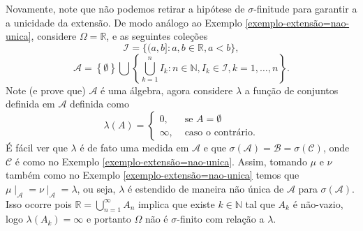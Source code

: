 \begin{exemplo}
    Novamente, note que não podemos retirar a hipótese de $\sigma$-finitude
    para garantir a a unicidade da extensão. De modo análogo ao Exemplo 
    \ref{exemplo-extensão=nao-unica}, considere $\Omega = \mathbb{R}$, e as seguintes
    coleções
    \[
	    \mathcal{I} =\{(a,b] : a,b \in \mathbb{R}, a<b\},
	\]
	\[
	    \mathcal{A} =\left\{\emptyset\right\} \bigcup
	    \left\{\bigcup_{k=1}^n I_k : n \in \mathbb{N}, 
	    I_k \in \mathcal{I}, k = 1, \dots, n\right\}.
	\]
    Note (e prove que) $\mathcal{A}$ é uma álgebra, agora considere $\lambda$ a 
    função de conjuntos definida em $\mathcal{A}$ definida como 
    \[
        \lambda(A)= \begin{cases}
                        0, & \text{ se } A = \emptyset \\
                        \infty, & \text { caso o contrário.}    
                    \end{cases}
    \]
    É fácil ver que $\lambda$ é de fato uma medida em $\mathcal{A}$ e que
    $\sigma(\mathcal{A}) = \mathcal{B}=\sigma(\mathcal{C})$,
    onde $\mathcal{C}$ é como no Exemplo \ref{exemplo-extensão=nao-unica}. Assim,
    tomando $\mu$ e $\nu$ também como no Exemplo \ref{exemplo-extensão=nao-unica}
    temos que $\mu\mid_{\mathcal{A}}=\nu\mid_{\mathcal{A}}=\lambda$, ou seja, $\lambda$
    é estendido de maneira não única de $\mathcal{A}$ para $\sigma(\mathcal{A})$.
    Isso ocorre pois $\mathbb{R}= \bigcup_{n =1}^{\infty} A_n$ implica que existe 
    $k \in \mathbb{N}$ tal que $A_k$ é não-vazio, logo $\lambda(A_k)= \infty$ e 
    portanto $\Omega$ não é $\sigma$-finito com relação a $\lambda$.
    
\end{exemplo}
